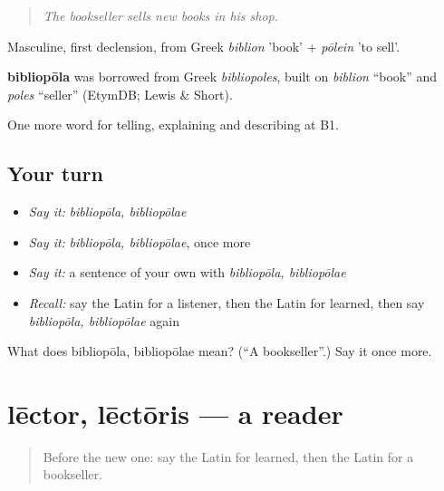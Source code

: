 \begin{quote}
\emph{The bookseller sells new books in his shop.}
\end{quote}

Masculine, first declension, from Greek \emph{biblion} 'book' + \emph{pōlein} 'to sell'.

\begin{cousinweb}
\textbf{bibliopōla} was borrowed from Greek \emph{bibliopoles}, built on \emph{biblion} \textquotedblleft{}book\textquotedblright{} and \emph{poles} \textquotedblleft{}seller\textquotedblright{} (EtymDB; Lewis \& Short).
\end{cousinweb}

\begin{grammarlens}[title={What you've built}]
One more word for telling, explaining and describing at B1.
\end{grammarlens}

\subsection*{Your turn}
\begin{itemize}
\raggedright
  \item \emph{Say it:} \emph{bibliopōla, bibliopōlae}
  \item \emph{Say it:} \emph{bibliopōla, bibliopōlae}, once more
  \item \emph{Say it:} a sentence of your own with \emph{bibliopōla, bibliopōlae}
  \item \emph{Recall:} say the Latin for a listener, then the Latin for learned, then say \emph{bibliopōla, bibliopōlae} again
\end{itemize}

\begin{tcolorbox}[breakable,colback=teal!4,colframe=teal!35!black,title={Before you move on}]
What does bibliopōla, bibliopōlae mean? (\textquotedblleft{}A bookseller\textquotedblright{}.) Say it once more.
\end{tcolorbox}
\section[lēctor, lēctōris]{lēctor, lēctōris — a reader}

\label{lesson:LA-C550-lector}



\begin{quote}
Before the new one: say the Latin for learned, then the Latin for a bookseller.
\end{quote}

